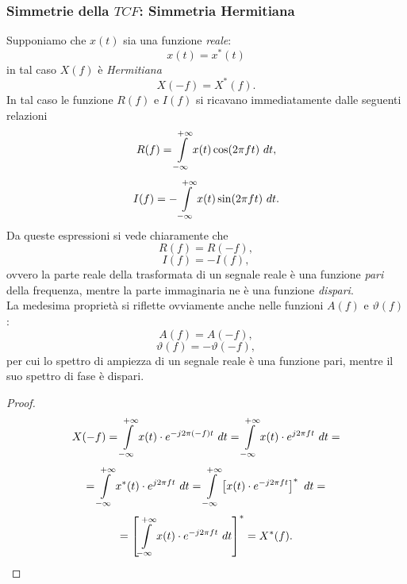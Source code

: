\documentclass[12pt,oneside,openany]{memoir}
\numberwithin{equation}{subsection}
\newcommand{\dt}{\ dt}
\begin{document}

\subsubsection{Simmetrie della $TCF$: Simmetria Hermitiana}
Supponiamo che $x(t)$ sia una funzione \textit{reale}:
\[
	x(t) = x^*(t)
\]
in tal caso $X(f)$ \`e \textit{Hermitiana}
\[
	X(-f) = X^*(f).
\]
In tal caso le funzione $R(f)$ e $I(f)$ si ricavano immediatamente dalle
seguenti relazioni
\[
	R(f) = \int\displaylimits_{-\infty}^{+\infty} x(t) \cos(2 \pi f t) \dt,
\]
\[
	I(f) = -\int\displaylimits_{-\infty}^{+\infty} x(t) \sin(2 \pi f t) \dt.
\]
Da queste espressioni si vede chiaramente che
\[
	R(f) = R(-f),
\]
\[
	I(f) = -I(f),
\]
ovvero la parte reale della trasformata di un segnale reale \`e una funzione
\textit{pari} della frequenza, mentre la parte immaginaria ne \`e una funzione
\textit{dispari}.\\
La medesima propriet\`a si riflette ovviamente anche nelle funzioni $A(f)$ e
$\vartheta(f)$:
\[
	A(f) = A(-f),
\]
\[
	\vartheta(f) = - \vartheta(-f),
\]
per cui lo spettro di ampiezza di un segnale reale \`e una funzione pari, mentre
il suo spettro di fase \`e dispari.
\begin{proof}
\[
	X(-f) = \int\displaylimits_{-\infty}^{+\infty} x(t) \cdot
	e^{-j 2 \pi (-f) t} \dt = \int\displaylimits_{-\infty}^{+\infty} x(t)
	\cdot e^{j 2 \pi f t} \dt =
\]
\[
	= \int\displaylimits_{-\infty}^{+\infty} x^*(t) \cdot e^{j 2 \pi f t}
	\dt = \int\displaylimits_{-\infty}^{+\infty} \left[x(t) \cdot
	e^{-j 2 \pi f t}\right]^* \dt =
\]
\[
	= \left[\int\displaylimits_{-\infty}^{+\infty} x(t) \cdot
	e^{-j 2 \pi f t} \dt\right]^* = X^*(f).
\]
\end{proof}


\newpage
\end{document}
